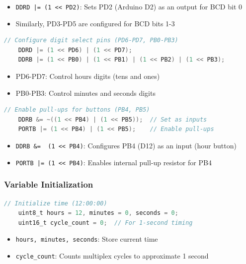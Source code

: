 \documentclass{article}
\begin{document}
\begin{itemize}
\item \texttt{DDRD |= (1 << PD2)}: Sets PD2 (Arduino D2) as an output for BCD bit 0
\item Similarly, PD3-PD5 are configured for BCD bits 1-3
\end{itemize}

\begin{lstlisting}[language=C]
    // Configure digit select pins (PD6-PD7, PB0-PB3)
    DDRD |= (1 << PD6) | (1 << PD7);
    DDRB |= (1 << PB0) | (1 << PB1) | (1 << PB2) | (1 << PB3);
\end{lstlisting}

\begin{itemize}
\item PD6-PD7: Control hours digits (tens and ones)
\item PB0-PB3: Control minutes and seconds digits
\end{itemize}

\begin{lstlisting}[language=C]
    // Enable pull-ups for buttons (PB4, PB5)
    DDRB &= ~((1 << PB4) | (1 << PB5));  // Set as inputs
    PORTB |= (1 << PB4) | (1 << PB5);    // Enable pull-ups
\end{lstlisting}

\begin{itemize}
\item \texttt{DDRB \&= ~(1 << PB4)}: Configures PB4 (D12) as an input (hour button)
\item \texttt{PORTB |= (1 << PB4)}: Enables internal pull-up resistor for PB4
\end{itemize}

\subsubsection{Variable Initialization}
\begin{lstlisting}[language=C]
    // Initialize time (12:00:00)
    uint8_t hours = 12, minutes = 0, seconds = 0;
    uint16_t cycle_count = 0;  // For 1-second timing
\end{lstlisting}

\begin{itemize}
\item \texttt{hours, minutes, seconds}: Store current time
\item \texttt{cycle\_count}: Counts multiplex cycles to approximate 1 second
\end{itemize}
\end{document}
